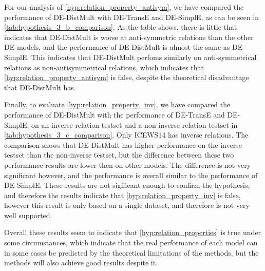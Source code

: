 For our analysis of \autoref{hyp:relation_property_antisym}, we have compared the performance of DE-DistMult with DE-TransE and DE-SimplE, as can be seen in \autoref{tab:hypothesis_3_b_comparison}.
As the table shows, there is little that indicates that DE-DistMult is worse at anti-symmetric relations than the other DE models, and the performance of DE-DistMult is almost the same as DE-SimplE. This indicates that DE-DistMult perfoms similarly on anti-symmetrical relations as non-antisymmetrical relations, which indicates that \autoref{hyp:relation_property_antisym} is false, despite the theoretical disadvantage that DE-DistMult has.

Finally, to evaluate \autoref{hyp:relation_property_inv}, we have compared the performance of DE-DistMult with the performance of DE-TransE and DE-SimplE, on an inverse relation testset and a non-inverse relation testset in \autoref{tab:hypothesis_3_c_comparison}. Only ICEWS14 has inverse relations.
The comparison shows that DE-DistMult has higher performance on the inverse testset than the non-inverse testset, but the difference between these two performance results are lower then on other models. The difference is not very significant however, and the performance is overall similar to the performance of DE-SimplE. These results are not sigificant enough to confirm the hypothesis, and therefore the results indicate that \autoref{hyp:relation_property_inv} is false, however this result is only based on a single dataset, and therefore is not very well supported.

Overall these results seem to indicate that \autoref{hyp:relation_properties} is true under some circumstances, which indicate that the real performance of each model can in some cases be predicted by the theoretical limitations of the methods, but the methods will also achieve good results despite it.
